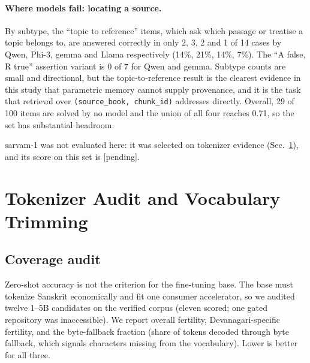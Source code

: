 \documentclass[10pt,twocolumn,letterpaper]{article}
\begin{document}
\paragraph{Where models fail: locating a source.}
By subtype, the ``topic to reference'' items, which ask which passage or treatise
a topic belongs to, are answered correctly in only 2, 3, 2 and 1 of 14 cases by
Qwen, Phi-3, gemma and Llama respectively (14\%, 21\%, 14\%, 7\%). The ``A false,
R true'' assertion variant is 0 of 7 for Qwen and gemma. Subtype counts are small
and directional, but the topic-to-reference result is the clearest evidence in
this study that parametric memory cannot supply provenance, and it is the task
that retrieval over \texttt{(source\_book, chunk\_id)} addresses directly.
Overall, 29 of 100 items are solved by no model and the union of all four reaches
0.71, so the set has substantial headroom.

sarvam-1 was not evaluated here: it was selected on tokenizer evidence
(Sec.~\ref{sec:tokenizer}), and its score on this set is [pending].

\section{Tokenizer Audit and Vocabulary Trimming}
\label{sec:tokenizer}

\subsection{Coverage audit}

Zero-shot accuracy is not the criterion for the fine-tuning base. The base must
tokenize Sanskrit economically and fit one consumer accelerator, so we audited
twelve 1--5B candidates on the verified corpus (eleven scored; one gated
repository was inaccessible). We report overall fertility, Devanagari-specific
fertility, and the byte-fallback fraction (share of tokens decoded through byte
fallback, which signals characters missing from the vocabulary). Lower is better
for all three.
\end{document}
